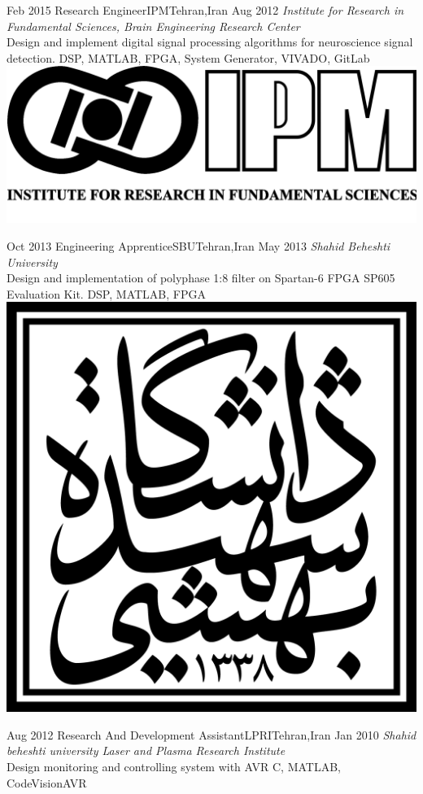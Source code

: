 \begin{experiences}
  \experience
  {Feb 2015} {Research Engineer}{IPM}{Tehran,Iran}
  {Aug 2012} {
    \emph{Institute for Research in Fundamental Sciences, Brain Engineering Research Center}\\
    Design and implement digital signal processing algorithms for neuroscience signal detection.
  }
  {DSP, MATLAB, FPGA, System Generator, VIVADO, GitLab}
  {\includegraphics[scale=0.025]{graphics/IPM_logo}}

  \emptySeparator

  \experience
  {Oct 2013} {Engineering Apprentice}{SBU}{Tehran,Iran}
  {May 2013} {
    \emph{Shahid Beheshti University}\\
    Design and implementation of polyphase 1:8 filter on Spartan-6 FPGA SP605 Evaluation Kit.
  }
  {DSP, MATLAB, FPGA}
  {\includegraphics[scale=0.05]{graphics/SBU_logo}}

  \emptySeparator

  \experience
  {Aug 2012} {Research And Development Assistant}{LPRI}{Tehran,Iran}
  {Jan 2010} {
    \emph{Shahid beheshti university Laser and Plasma Research Institute}\\
    Design  monitoring and controlling system with AVR
  }
  {C, MATLAB, CodeVisionAVR}
  {}
\end{experiences}
